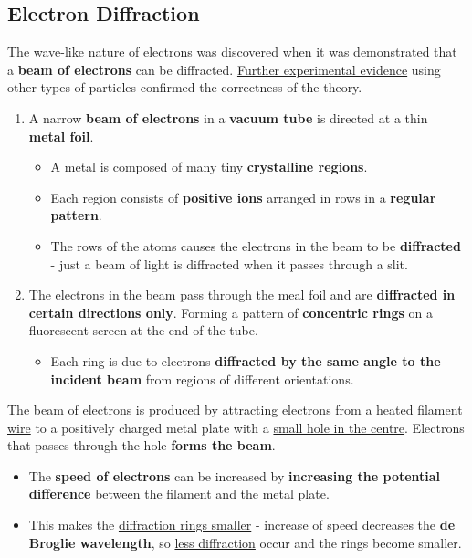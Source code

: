 \subsection*{Electron Diffraction}

The wave-like nature of electrons was discovered when it was demonstrated that a \textbf{beam of electrons} can be diffracted. \underline{Further experimental evidence} using other types of particles confirmed the correctness of the theory.

\begin{enumerate}
    \item A narrow \textbf{beam of electrons} in a \textbf{vacuum tube} is directed at a thin \textbf{metal foil}.
        \begin{itemize}
            \item A metal is composed of many tiny \textbf{crystalline regions}.
            \item Each region consists of \textbf{positive ions} arranged in rows in a \textbf{regular pattern}.
            \item The rows of the atoms causes the electrons in the beam to be \textbf{diffracted} - just a beam of light is diffracted when it passes through a slit.
        \end{itemize}
    \item The electrons in the beam pass through the meal foil and are \textbf{diffracted in certain directions only}. Forming a pattern of \textbf{concentric rings} on a fluorescent screen at the end of the tube.
        \begin{itemize}
            \item Each ring is due to electrons \textbf{diffracted by the same angle to the incident beam} from regions of different orientations.
        \end{itemize}
\end{enumerate}

The beam of electrons is produced by \underline{attracting electrons from a heated filament wire} to a positively charged metal plate with a \underline{small hole in the centre}. Electrons that passes through the hole \textbf{forms the beam}.
\begin{itemize}
    \item The \textbf{speed of electrons} can be increased by \textbf{increasing the potential difference} between the filament and the metal plate.
    \item This makes the \underline{diffraction rings smaller} - increase of speed decreases the \textbf{de Broglie wavelength}, so \underline{less diffraction} occur and the rings become smaller.
\end{itemize}

